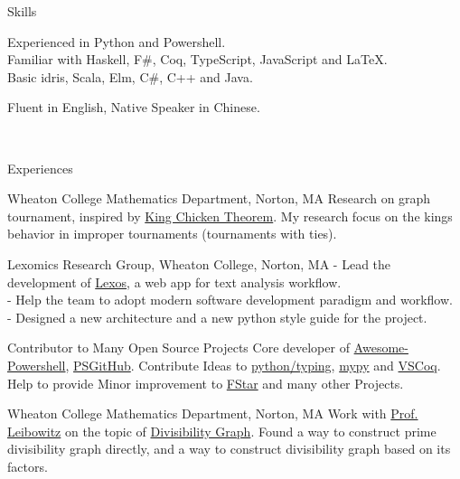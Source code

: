 \documentclass[]{resume-knyte}
\begin{document}
\begin{topic}{Skills}


    {Experienced in Python and Powershell.\\
    Familiar with Haskell, F\#, Coq, TypeScript, JavaScript and \LaTeX{}.\\
    Basic idris, Scala, Elm, C\#, C++ and Java.}

    {Fluent in English, Native Speaker in Chinese.}

    \\ %
\end{topic}


\begin{topic}{Experiences}


    {Wheaton College Mathematics Department, Norton, MA}
    {Research on graph tournament, inspired by \href{https://www.maa.org/sites/default/files/pdf/upload_library/22/Allendoerfer/1981/0025570x.di021114.02p00982.pdf}{King Chicken Theorem}.
    My research focus on the kings behavior in improper tournaments (tournaments with ties).}

    {Lexomics Research Group, Wheaton College, Norton, MA}
    {- Lead the development of \href{https://github.com/WheatonCS/Lexos}{Lexos}, a web app for text analysis workflow.\\
    - Help the team to adopt modern software development paradigm and workflow.\\
    - Designed a new architecture and a new python style guide for the project.}

    {Contributor to Many Open Source Projects}
    {Core developer of \href{https://github.com/janikvonrotz/awesome-powershell}{Awesome-Powershell}, \href{https://github.com/pcgeek86/PSGitHub}{PSGitHub}.
    Contribute Ideas to \href{https://github.com/python/typing}{python/typing}, \href{https://github.com/python/mypy}{mypy} and \href{https://github.com/siegebell/vscoq}{VSCoq}.
    Help to provide Minor improvement to \href{https://github.com/FStarLang/FStar}{FStar} and many other Projects.}

    {Wheaton College Mathematics Department, Norton, MA}
    {Work with \href{https://wheatoncollege.edu/academics/faculty-directory/rochelle-shelly-leibowitz/}{Prof. Leibowitz}
    on the topic of \href{https://chantisnake.github.io/2016/05/22/explain-the-divisibility-graph/}{Divisibility Graph}.
    Found a way to construct prime divisibility graph directly, and a way to construct divisibility graph based on its factors.}

\\ %
\end{topic}
\end{document}
